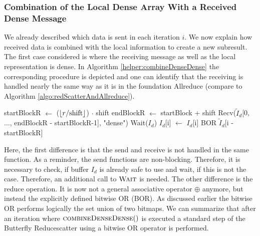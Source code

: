 \subsubsection{Combination of the Local Dense Array With a Received Dense Message}
We already described which data is sent in each iteration $i$. We now explain how received data is combined with the local information to create a new  subresult. The first case considered is where the receiving message as well as the local representation is dense. In Algorithm \ref{helper:combineDenseDense} the corresponding procedure is depicted and one can identify that the receiving is handled nearly the same way as it is in the foundation Allreduce (compare to Algorithm \ref{algo:redScatterAndAllreduce}).
\begin{algorithm}
	\caption{– combine received dense blocks into own dense array.\\
	Variable nomenclature is the same as in Algorithm \ref{algo:SetUnionExactHalving}. Changes of variables apply to the original ones.}
	\label{helper:combineDenseDense}
	\begin{algorithmic}[1]
			\State startBlockR $\gets$ ($\lfloor r/\text{shift}\rfloor$) $\cdot$ shift
			\State endBlockR $\gets$ startBlock + shift
			\State Recv($\tilde{I}_d$[0, $\dots$, endBlockR - startBlockR-1], "dense")
			\State Wait($I_d$) 
			\State $I_d$[i] $\gets$ $I_d$[i] BOR  $\tilde{I}_d$[i - startBlockR] 
			\EndFor
		\EndProcedure
	\end{algorithmic}
\end{algorithm}
Here, the first difference is that the send and receive is not handled in the same function. As a reminder, the send functions are non-blocking. Therefore, it is necessary to check, if buffer $I_d$ is already safe to use and wait, if this is not the case. Therefore, an additional call to $\Call{Wait}{}$ is needed. The other difference is the reduce operation. It is now not a general associative operator $\oplus$ anymore, but instead the explicitly defined bitwise OR (BOR). As discussed earlier the bitwise OR performs logically the set union of two bitmaps. We can summarize that after an iteration where $\Call{combineDenseDense}{ }$ is executed a standard step of the Butterfly Reducescatter using a bitwise OR operator is performed.

